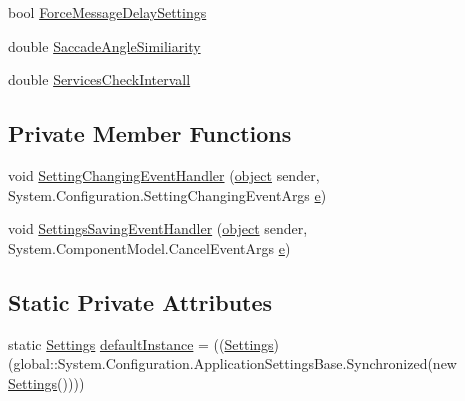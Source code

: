 \begin{DoxyCompactItemize}
\item 
bool \hyperlink{class_web_analyzer_1_1_properties_1_1_settings_a4ffaf53cd26be8670474783fbdaf380c}{Force\+Message\+Delay\+Settings}
\item 
double \hyperlink{class_web_analyzer_1_1_properties_1_1_settings_a7c8084a45024f9b5bb40f0658bdf41cd}{Saccade\+Angle\+Similiarity}
\item 
double \hyperlink{class_web_analyzer_1_1_properties_1_1_settings_a66420ac2f6c7a2eb88499bb9978b7d63}{Services\+Check\+Intervall}
\end{DoxyCompactItemize}
\subsection*{Private Member Functions}
\begin{DoxyCompactItemize}
\item 
void \hyperlink{class_web_analyzer_1_1_properties_1_1_settings_ade54623f5935cf04300ab15254d1a846}{Setting\+Changing\+Event\+Handler} (\hyperlink{_u_i_2_h_t_m_l_resources_2js_2lib_2underscore_8min_8js_aae18b7515bb2bc4137586506e7c0c903}{object} sender, System.\+Configuration.\+Setting\+Changing\+Event\+Args \hyperlink{_u_i_2_h_t_m_l_resources_2js_2lib_2bootstrap_8min_8js_ab5902775854a8b8440bcd25e0fe1c120}{e})
\item 
void \hyperlink{class_web_analyzer_1_1_properties_1_1_settings_a539f50459d03d0782e76117c5a3ed3eb}{Settings\+Saving\+Event\+Handler} (\hyperlink{_u_i_2_h_t_m_l_resources_2js_2lib_2underscore_8min_8js_aae18b7515bb2bc4137586506e7c0c903}{object} sender, System.\+Component\+Model.\+Cancel\+Event\+Args \hyperlink{_u_i_2_h_t_m_l_resources_2js_2lib_2bootstrap_8min_8js_ab5902775854a8b8440bcd25e0fe1c120}{e})
\end{DoxyCompactItemize}
\subsection*{Static Private Attributes}
\begin{DoxyCompactItemize}
\item 
static \hyperlink{class_web_analyzer_1_1_properties_1_1_settings}{Settings} \hyperlink{class_web_analyzer_1_1_properties_1_1_settings_a384f24a72fe5cd4bd437c9fdecf5e8ce}{default\+Instance} = ((\hyperlink{class_web_analyzer_1_1_properties_1_1_settings}{Settings})(global\+::\+System.\+Configuration.\+Application\+Settings\+Base.\+Synchronized(new \hyperlink{class_web_analyzer_1_1_properties_1_1_settings}{Settings}())))
\end{DoxyCompactItemize}


